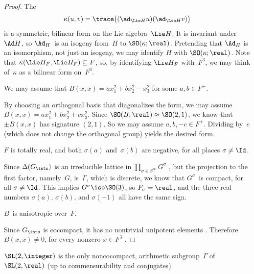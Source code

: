\begin{proof}
The 
 $$ \kappa(u,v) = \trace \bigl( (\ad_{\Lie H} u) (\ad_{\Lie
H} v) \bigr) $$
 is a symmetric, bilinear form on the Lie algebra~$\Lie H$.
It is invariant under $\Ad H$, so $\Ad_H$~is an isogeny
from~$H$ to $\SO(\kappa;\real)$. Pretending that $\Ad_H$ is
an isomorphism, not just an isogeny, we may identify $H$
with $\SO(\kappa;\real)$. Note that $\kappa(\Lie H_F, \Lie
H_F) \subseteq F$, so, by identifying $\Lie H_F$ with~$F^3$,
we may think of~$\kappa$ as a bilinear form on~$F^3$.

\begin{step}
 We may assume that $B(x,x) = a x_1^2 + b x_2^2 - x_3^2$
for some $a,b \in F^+$.
 \end{step}
 By choosing an orthogonal basis that diagonalizes the form, we may assume $B(x,x) = a
x_1^2 + b x_2^2 + c x_3^2$. Since $\SO(B;\real) \approx
\SO(2,1)$, we know that $\pm B(x,x)$ has signature
$(2,1)$. So we may assume $a,b,-c \in F^+$. Dividing by~$c$
(which does not change the orthogonal group) yields the
desired form.

\begin{step} \label{CocpctArithSO21Pf-totreal}
 $F$ is totally real, and both $\sigma(a)$ and~$\sigma(b)$
are negative, for all places $\sigma \neq \Id$.
 \end{step}
 Since $\Delta(G_{\ints})$ is an
irreducible lattice in $\prod_{\sigma \in S^\infty}
G^\sigma$ , but the projection to the
first factor, namely~$G$, is~$\Gamma$, which is discrete,
we know that $G^\sigma$~is compact, for all $\sigma \neq
\Id$. This implies $G^\sigma \iso \SO(3)$, so $F_\sigma = \real$,
and the three real numbers $\sigma(a)$, $\sigma(b)$, and
$\sigma(-1)$ all have the same sign.

\begin{step} \label{CocpctArithSO21Pf-anis}
 $B$~is anisotropic over~$F$.
 \end{step} 
 Since $G_{\ints}$ is cocompact, it has no nontrivial unipotent elements . Therefore
$B(x,x) \neq 0$, for every nonzero $x \in F^3$
.
 \end{proof}

\begin{prop} \label{NoncocpctSL2R=SL2Z}
 $\SL(2,\integer)$ is the only noncocompact, arithmetic
subgroup\/~$\Gamma$ of\/ $\SL(2,\real)$ \textup(up to commensurability
and conjugates\textup).
 \end{prop} 

